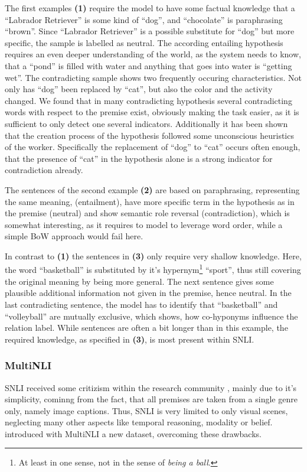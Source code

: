 The first examples \textbf{(1)} require the model to have some factual knowledge that a ``Labrador Retriever'' is some kind of ``dog'', and ``chocolate'' is paraphrasing ``brown''. Since ``Labrador Retriever'' is a possible substitute for ``dog'' but more specific, the sample is labelled as neutral. The according entailing hypothesis requires an even deeper understanding of the world, as the system needs to know, that a ``pond'' is filled with water and anything that goes into water is ``getting wet''. The contradicting sample shows two frequently occuring characteristics. Not only has ``dog'' been replaced by ``cat'', but also the color and the activity changed. We found that in many contradicting hypothesis several contradicting words with respect to the premise exist, obviously making the task easier, as it is sufficient to only detect one several indicators. Additionally it has been shown that the creation process of the hypothesis followed some unconscious heuristics of the worker\citep{gururangan2018annotation}. Specifically the replacement of ``dog'' to ``cat'' occurs often enough, that the presence of ``cat'' in the hypothesis alone is a strong indicator for contradiction already. 
\newline

\noindent
The sentences of the second example \textbf{(2)} are based on paraphrasing, representing the same meaning, (entailment), have more specific term in the hypothesis as in the premise (neutral) and show semantic role reversal (contradiction),  which is somewhat interesting, as it requires to model to leverage word order, while a simple \ac{BoW} approach would fail here.
\newline

\noindent
In contrast to \textbf{(1)} the sentences in \textbf{(3)} only require very shallow knowledge. Here, the word ``basketball'' is substituted by it's hypernym\footnote{At least in one sense, not in the sense of \textit{being a ball}.} ``sport'', thus still covering the original meaning by being more general. The next sentence gives some plausible additional information not given in the premise, hence neutral. In the last contradicting sentence, the model has to identify that ``basketball'' and ``volleyball'' are mutually exclusive, which shows, how co-hyponyms influence the relation label. While sentences are often a bit longer than in this example, the required knowledge, as specified in \textbf{(3)}, is most present within \ac{SNLI}.

\subsubsection{MultiNLI}
\ac{SNLI} received some critizism within the research community \citep{chatzikyriakidis2017overview,williams2017broad}, mainly due to it's simplicity, cominng from the fact, that all premises are taken from a single genre only, namely image captions. Thus, \ac{SNLI} is very limited to only visual scenes, neglecting many other aspects like temporal reasoning, modality or belief. \cite{williams2017broad} introduced with \ac{MultiNLI} a new dataset, overcoming these drawbacks. 
